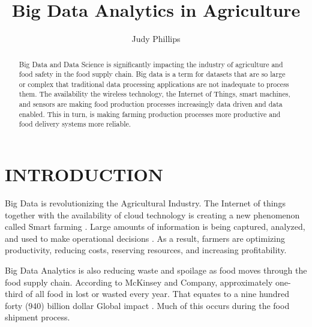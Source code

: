 \documentclass[sigconf]{acmart}
\begin{document}
\title{Big Data Analytics in Agriculture}


\author{Judy Phillips}

\renewcommand{\shortauthors}{B. Trovato et al.}


\begin{abstract}
Big Data and Data Science is significantly impacting the industry of agriculture and food safety in the food supply chain. Big data is a term for datasets that are so large or complex that traditional data processing applications are not inadequate to process them. The availability the wireless technology, the Internet of Things, smart machines, and sensors are making food production processes increasingly data driven and data enabled. This in turn, is making farming production processes more productive and food delivery systems more reliable. 
\end{abstract}



\maketitle

\section{INTRODUCTION}

Big Data is revolutionizing the Agricultural Industry. The Internet of things together with the availability of cloud technology is creating a new phenomenon called Smart farming \cite{Wolfert}. Large amounts of information is being captured, analyzed, and used to make operational decisions  \cite{DevEcon}.  As a result, farmers are optimizing productivity, reducing costs, reserving resources, and increasing profitability. 

Big Data Analytics is also reducing waste and spoilage as food moves through the food supply chain.  According to McKinsey and Company, approximately one-third of all food in lost or wasted every year.  That equates to a nine hundred forty (940) billion dollar Global impact \cite{www-google-bigdatatech}.  Much of this occurs during the food shipment process.  
\end{document}
